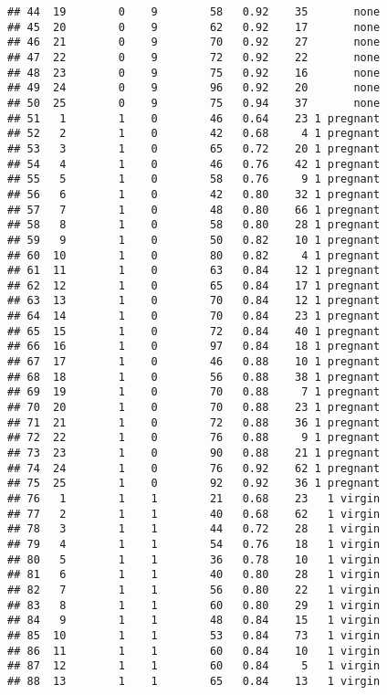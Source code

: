 \documentclass[]{article}
\begin{document}
\begin{verbatim}
## 44  19        0    9        58   0.92    35       none
## 45  20        0    9        62   0.92    17       none
## 46  21        0    9        70   0.92    27       none
## 47  22        0    9        72   0.92    22       none
## 48  23        0    9        75   0.92    16       none
## 49  24        0    9        96   0.92    20       none
## 50  25        0    9        75   0.94    37       none
## 51   1        1    0        46   0.64    23 1 pregnant
## 52   2        1    0        42   0.68     4 1 pregnant
## 53   3        1    0        65   0.72    20 1 pregnant
## 54   4        1    0        46   0.76    42 1 pregnant
## 55   5        1    0        58   0.76     9 1 pregnant
## 56   6        1    0        42   0.80    32 1 pregnant
## 57   7        1    0        48   0.80    66 1 pregnant
## 58   8        1    0        58   0.80    28 1 pregnant
## 59   9        1    0        50   0.82    10 1 pregnant
## 60  10        1    0        80   0.82     4 1 pregnant
## 61  11        1    0        63   0.84    12 1 pregnant
## 62  12        1    0        65   0.84    17 1 pregnant
## 63  13        1    0        70   0.84    12 1 pregnant
## 64  14        1    0        70   0.84    23 1 pregnant
## 65  15        1    0        72   0.84    40 1 pregnant
## 66  16        1    0        97   0.84    18 1 pregnant
## 67  17        1    0        46   0.88    10 1 pregnant
## 68  18        1    0        56   0.88    38 1 pregnant
## 69  19        1    0        70   0.88     7 1 pregnant
## 70  20        1    0        70   0.88    23 1 pregnant
## 71  21        1    0        72   0.88    36 1 pregnant
## 72  22        1    0        76   0.88     9 1 pregnant
## 73  23        1    0        90   0.88    21 1 pregnant
## 74  24        1    0        76   0.92    62 1 pregnant
## 75  25        1    0        92   0.92    36 1 pregnant
## 76   1        1    1        21   0.68    23   1 virgin
## 77   2        1    1        40   0.68    62   1 virgin
## 78   3        1    1        44   0.72    28   1 virgin
## 79   4        1    1        54   0.76    18   1 virgin
## 80   5        1    1        36   0.78    10   1 virgin
## 81   6        1    1        40   0.80    28   1 virgin
## 82   7        1    1        56   0.80    22   1 virgin
## 83   8        1    1        60   0.80    29   1 virgin
## 84   9        1    1        48   0.84    15   1 virgin
## 85  10        1    1        53   0.84    73   1 virgin
## 86  11        1    1        60   0.84    10   1 virgin
## 87  12        1    1        60   0.84     5   1 virgin
## 88  13        1    1        65   0.84    13   1 virgin

\end{verbatim}
\end{document}
